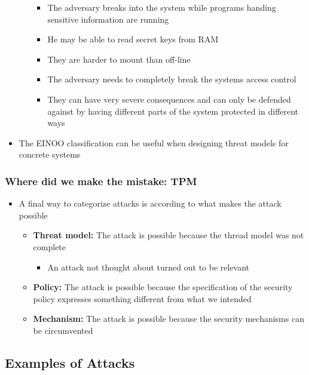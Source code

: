 \documentclass[11pt]{article}
\begin{document}
\begin{itemize}
\begin{itemize}
\begin{itemize}
\item The adversary breaks into the system while programs handing sensitive information are running
\item He may be able to read secret keys from RAM
\item They are harder to mount than off-line
\item The adversary needs to completely break the systems access control
\item They can have very severe consequences and can only be defended against by having different parts of the system protected in different ways
\end{itemize}
\end{itemize}

\item The EINOO classification can be useful when designing threat models for concrete systems
\end{itemize}

\subsubsection{Where did we make the mistake: TPM}
\label{sec:orgb13b271}
\begin{itemize}
\item A final way to categorize attacks is according to what makes the attack possible
\begin{itemize}
\item \textbf{Threat model:} The attack is possible because the thread model was not complete
\begin{itemize}
\item An attack not thought about turned out to be relevant
\end{itemize}
\item \textbf{Policy:} The attack is possible because the specification of the security policy expresses something different from what we intended
\item \textbf{Mechanism:} The attack is possible because the security mechanisms can be circumvented
\end{itemize}
\end{itemize}

\subsection{Examples of Attacks}
\label{sec:org50c2e41}
\end{document}
